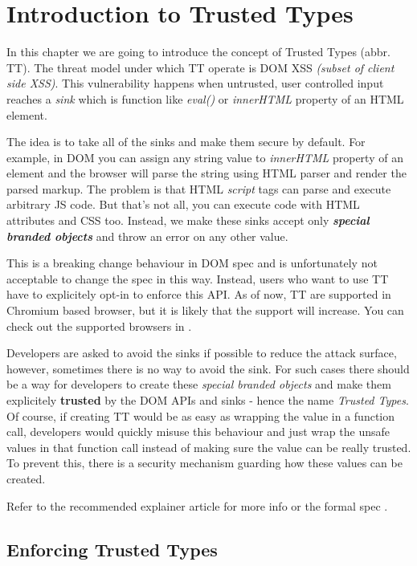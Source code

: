 \chapter{Introduction to Trusted Types}

\label{chapter:intro-tt} %

In this chapter we are going to introduce the concept of Trusted Types (abbr. TT). The threat model
under which TT operate is DOM XSS \emph{(subset of client side XSS)}. This vulnerability happens
when untrusted, user controlled input reaches a \emph{sink} which is function like \emph{eval()} or
\emph{innerHTML} property of an HTML element.

The idea is to take all of the sinks and make them secure by default. For example, in DOM you can
assign any string value to \emph{innerHTML} property of an element and the browser will parse the
string using HTML parser and render the parsed markup. The problem is that HTML \emph{script} tags
can parse and execute arbitrary JS code. But that's not all, you can execute code with HTML
attributes and CSS too. Instead, we make these sinks accept only \emph{\textbf{special branded
    objects}} and throw an error on any other value.

This is a breaking change behaviour in DOM spec and is unfortunately not acceptable to change the
spec in this way. Instead, users who want to use TT have to explicitely opt-in to enforce this API.
As of now, TT are supported in Chromium based browser, but it is likely that the support will
increase. You can check out the supported browsers in \cite{tt_compatibility}.

Developers are asked to avoid the sinks if possible to reduce the attack surface, however, sometimes
there is no way to avoid the sink. For such cases there should be a way for developers to create
these \emph{special branded objects} and make them explicitely \textbf{trusted} by the DOM APIs and
sinks - hence the name \emph{Trusted Types}. Of course, if creating TT would be as easy as wrapping
the value in a function call, developers would quickly misuse this behaviour and just wrap the
unsafe values in that function call instead of making sure the value can be really trusted. To
prevent this, there is a security mechanism guarding how these values can be created.

Refer to the recommended explainer article for more info \cite{trusted_types_into} or the formal
spec \cite{tt_spec}.

\section{Enforcing Trusted Types}

